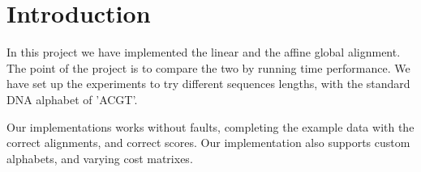 \section{Introduction}
In this project we have implemented the linear and the affine global alignment. The point of the project is to compare the two by running time performance. We have set up the experiments to try different sequences lengths, with the standard DNA alphabet of 'ACGT'.

Our implementations works without faults, completing the example data with the correct alignments, and correct scores. Our implementation also supports custom alphabets, and varying cost matrixes.